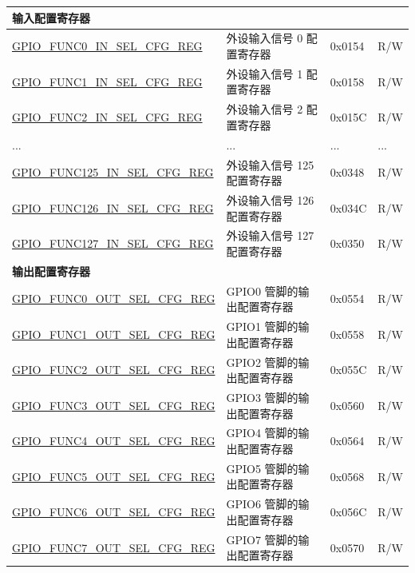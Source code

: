 \begin{longtable}{ | p{6cm} | p{6.7cm} | p{1.3cm} | p{1.5cm} | }
\multicolumn{4}{|l|}{\textbf{输入配置寄存器}} \\ \hline
\hyperref[regdesc:GPIOFUNCNINSELCFGREG]{GPIO\_FUNC0\_IN\_SEL\_CFG\_REG} & 外设输入信号 0 配置寄存器 & 0x0154 & R/W \\ \hline
\hyperref[regdesc:GPIOFUNCNINSELCFGREG]{GPIO\_FUNC1\_IN\_SEL\_CFG\_REG} & 外设输入信号 1 配置寄存器 & 0x0158 & R/W \\ \hline
\hyperref[regdesc:GPIOFUNCNINSELCFGREG]{GPIO\_FUNC2\_IN\_SEL\_CFG\_REG} & 外设输入信号 2 配置寄存器 & 0x015C & R/W \\ \hline
... & ... & ... & ... \\ \hline
\hyperref[regdesc:GPIOFUNCNINSELCFGREG]{GPIO\_FUNC125\_IN\_SEL\_CFG\_REG} & 外设输入信号 125 配置寄存器 & 0x0348 & R/W \\ \hline
\hyperref[regdesc:GPIOFUNCNINSELCFGREG]{GPIO\_FUNC126\_IN\_SEL\_CFG\_REG} & 外设输入信号 126 配置寄存器 & 0x034C & R/W \\ \hline
\hyperref[regdesc:GPIOFUNCNINSELCFGREG]{GPIO\_FUNC127\_IN\_SEL\_CFG\_REG} & 外设输入信号 127 配置寄存器 & 0x0350 & R/W \\ \hline
\multicolumn{4}{|l|}{\textbf{输出配置寄存器}} \\ \hline
\hyperref[regdesc:GPIOFUNCNOUTSELCFGREG]{GPIO\_FUNC0\_OUT\_SEL\_CFG\_REG} & GPIO0 管脚的输出配置寄存器 & 0x0554 & R/W \\ \hline
\hyperref[regdesc:GPIOFUNCNOUTSELCFGREG]{GPIO\_FUNC1\_OUT\_SEL\_CFG\_REG} & GPIO1 管脚的输出配置寄存器 & 0x0558 & R/W \\ \hline
\hyperref[regdesc:GPIOFUNCNOUTSELCFGREG]{GPIO\_FUNC2\_OUT\_SEL\_CFG\_REG} & GPIO2 管脚的输出配置寄存器 & 0x055C & R/W \\ \hline
\hyperref[regdesc:GPIOFUNCNOUTSELCFGREG]{GPIO\_FUNC3\_OUT\_SEL\_CFG\_REG} & GPIO3 管脚的输出配置寄存器 & 0x0560 & R/W \\ \hline
\hyperref[regdesc:GPIOFUNCNOUTSELCFGREG]{GPIO\_FUNC4\_OUT\_SEL\_CFG\_REG} & GPIO4 管脚的输出配置寄存器 & 0x0564 & R/W \\ \hline
\hyperref[regdesc:GPIOFUNCNOUTSELCFGREG]{GPIO\_FUNC5\_OUT\_SEL\_CFG\_REG} & GPIO5 管脚的输出配置寄存器 & 0x0568 & R/W \\ \hline
\hyperref[regdesc:GPIOFUNCNOUTSELCFGREG]{GPIO\_FUNC6\_OUT\_SEL\_CFG\_REG} & GPIO6 管脚的输出配置寄存器 & 0x056C & R/W \\ \hline
\hyperref[regdesc:GPIOFUNCNOUTSELCFGREG]{GPIO\_FUNC7\_OUT\_SEL\_CFG\_REG} & GPIO7 管脚的输出配置寄存器 & 0x0570 & R/W \\ \hline

\end{longtable}
